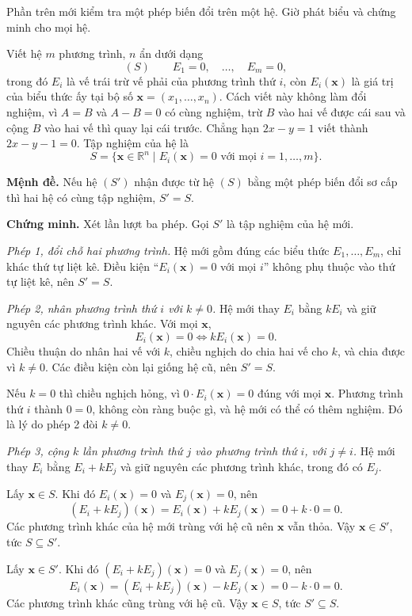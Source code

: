 \documentclass[12pt,a4paper]{article}
\begin{document}
Phần trên mới kiểm tra một phép biến đổi trên một hệ. Giờ phát biểu và chứng minh cho mọi hệ.

Viết hệ \(m\) phương trình, \(n\) ẩn dưới dạng
$$ (S)\qquad E_1=0,\quad\ldots,\quad E_m=0, $$
trong đó \(E_i\) là vế trái trừ vế phải của phương trình thứ \(i\), còn \(E_i(\mathbf{x})\) là giá trị của biểu thức ấy tại bộ số \(\mathbf{x}=(x_1,\ldots,x_n)\).
Cách viết này không làm đổi nghiệm, vì \(A=B\) và \(A-B=0\) có cùng nghiệm, trừ \(B\) vào hai vế được cái sau và cộng \(B\) vào hai vế thì quay lại cái trước. Chẳng hạn \(2x-y=1\) viết thành \(2x-y-1=0\). Tập nghiệm của hệ là
$$ S=\{\mathbf{x}\in\mathbb{R}^n \mid E_i(\mathbf{x})=0 \text{ với mọi } i=1,\ldots,m\}. $$

\textbf{Mệnh đề.} Nếu hệ \((S')\) nhận được từ hệ \((S)\) bằng một phép biến đổi sơ cấp thì hai hệ có cùng tập nghiệm, \(S'=S\).

\textbf{Chứng minh.} Xét lần lượt ba phép. Gọi \(S'\) là tập nghiệm của hệ mới.

\emph{Phép 1, đổi chỗ hai phương trình.} Hệ mới gồm đúng các biểu thức \(E_1,\ldots,E_m\), chỉ khác thứ tự liệt kê. Điều kiện ``\(E_i(\mathbf{x})=0\) với mọi \(i\)'' không phụ thuộc vào thứ tự liệt kê, nên \(S'=S\).

\emph{Phép 2, nhân phương trình thứ \(i\) với \(k\neq0\).} Hệ mới thay \(E_i\) bằng \(kE_i\) và giữ nguyên các phương trình khác. Với mọi \(\mathbf{x}\),
$$ E_i(\mathbf{x})=0 \iff kE_i(\mathbf{x})=0. $$
Chiều thuận do nhân hai vế với \(k\), chiều nghịch do chia hai vế cho \(k\), và chia được vì \(k\neq0\). Các điều kiện còn lại giống hệ cũ, nên \(S'=S\).

Nếu \(k=0\) thì chiều nghịch hỏng, vì \(0\cdot E_i(\mathbf{x})=0\) đúng với mọi \(\mathbf{x}\). Phương trình thứ \(i\) thành \(0=0\), không còn ràng buộc gì, và hệ mới có thể có thêm nghiệm. Đó là lý do phép 2 đòi \(k\neq0\).

\emph{Phép 3, cộng \(k\) lần phương trình thứ \(j\) vào phương trình thứ \(i\), với \(j\neq i\).} Hệ mới thay \(E_i\) bằng \(E_i+kE_j\) và giữ nguyên các phương trình khác, trong đó có \(E_j\).

Lấy \(\mathbf{x}\in S\). Khi đó \(E_i(\mathbf{x})=0\) và \(E_j(\mathbf{x})=0\), nên
$$ (E_i+kE_j)(\mathbf{x})=E_i(\mathbf{x})+kE_j(\mathbf{x})=0+k\cdot0=0. $$
Các phương trình khác của hệ mới trùng với hệ cũ nên \(\mathbf{x}\) vẫn thỏa. Vậy \(\mathbf{x}\in S'\), tức \(S\subseteq S'\).

Lấy \(\mathbf{x}\in S'\). Khi đó \((E_i+kE_j)(\mathbf{x})=0\) và \(E_j(\mathbf{x})=0\), nên
$$ E_i(\mathbf{x})=(E_i+kE_j)(\mathbf{x})-kE_j(\mathbf{x})=0-k\cdot0=0. $$
Các phương trình khác cũng trùng với hệ cũ. Vậy \(\mathbf{x}\in S\), tức \(S'\subseteq S\).
\end{document}
